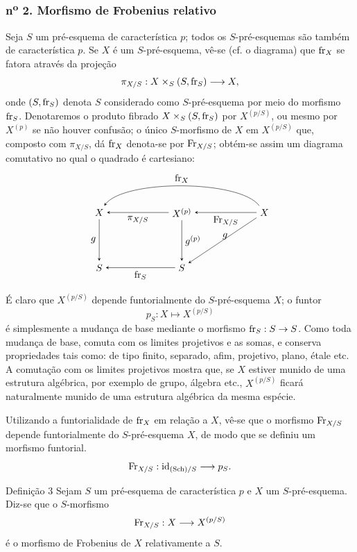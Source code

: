 \subsubsection*{n\textsuperscript{o} 2. Morfismo de Frobenius relativo}

Seja $S$ um pré-esquema de característica $p$; todos os $S$-pré-esquemas são também de característica $p$. Se $X$ é um $S$-pré-esquema, vê-se (cf. o diagrama) que $\operatorname{fr}_X$ se fatora através da projeção
\[
\pi_{X/S}:X\times_S(S,\operatorname{fr}_S)\longrightarrow X,
\]
onde $(S,\operatorname{fr}_S)$ denota $S$ considerado como $S$-pré-esquema por meio do morfismo $\operatorname{fr}_S$. Denotaremos o produto fibrado $X\times_S(S,\operatorname{fr}_S)$ por $X^{(p/S)}$, ou mesmo por $X^{(p)}$ se não houver confusão; o único $S$-morfismo de $X$ em $X^{(p/S)}$ que, composto com $\pi_{X/S}$, dá $\operatorname{fr}_X$ denota-se por $\operatorname{Fr}_{X/S}$; obtém-se assim um diagrama comutativo no qual o quadrado é cartesiano:
\[
\begin{tikzpicture}[baseline=(current bounding box.center),>=stealth]
\node (XL) at (0,2.0) {$X$};
\node (XM) at (3.0,2.0) {$X^{(p)}$};
\node (XR) at (6.0,2.0) {$X$};
\node (SL) at (0,0) {$S$};
\node (SM) at (3.0,0) {$S$};
\draw[->] (XM) -- node[below] {$\pi_{X/S}$} (XL);
\draw[->] (XR) -- node[below] {$\Fr_{X/S}$} (XM);
\draw[->] (XR) .. controls (5.1,3.2) and (0.9,3.2) .. node[above] {$\fr_X$} (XL);
\draw[->] (XL) -- node[left] {$g$} (SL);
\draw[->] (XM) -- node[right] {$g^{(p)}$} (SM);
\draw[->] (XR) -- node[pos=.55,above right] {$g$} (SM);
\draw[->] (SM) -- node[below] {$\fr_S$} (SL);
\end{tikzpicture}
\]

É claro que $X^{(p/S)}$ depende funtorialmente do $S$-pré-esquema $X$; o funtor
\[
p_S:X\longmapsto X^{(p/S)}
\]
é simplesmente a mudança de base mediante o morfismo $\operatorname{fr}_S:S\to S$. Como toda mudança de base, comuta com os limites projetivos e as somas, e conserva propriedades tais como: de tipo finito, separado, afim, projetivo, plano, étale etc. A comutação com os limites projetivos mostra que, se $X$ estiver munido de uma estrutura algébrica, por exemplo de grupo, álgebra etc., $X^{(p/S)}$ ficará naturalmente munido de uma estrutura algébrica da mesma espécie.

Utilizando a funtorialidade de $\operatorname{fr}_X$ em relação a $X$, vê-se que o morfismo $\operatorname{Fr}_{X/S}$ depende funtorialmente do $S$-pré-esquema $X$, de modo que se definiu um morfismo funtorial.
\[
\operatorname{Fr}_{X/S}:\operatorname{id}_{(\operatorname{Sch})/S}\longrightarrow p_S.
\]

\begin{statement}{Definição 3}
Sejam $S$ um pré-esquema de característica $p$ e $X$ um $S$-pré-esquema. Diz-se que o $S$-morfismo
\[
\operatorname{Fr}_{X/S}:X\longrightarrow X^{(p/S)}
\]
é o morfismo de Frobenius de $X$ relativamente a $S$.
\end{statement}
